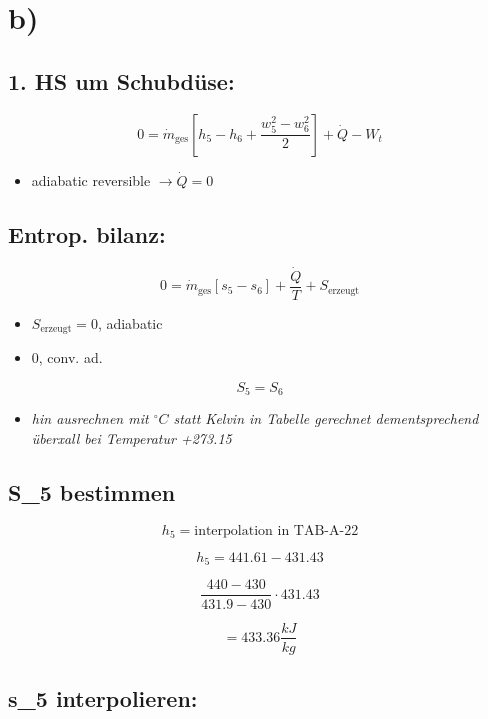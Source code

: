 

\section*{b)}

\subsection*{1. HS um Schubdüse:}

\[
0 = \dot{m}_{\text{ges}} \left[ h_5 - h_6 + \frac{w_5^2 - w_6^2}{2} \right] + \dot{Q} - W_t
\]

\begin{itemize}
    \item adiabatic reversible $\rightarrow \dot{Q} = 0$
\end{itemize}

\subsection*{Entrop. bilanz:}

\[
0 = \dot{m}_{\text{ges}} \left[ s_5 - s_6 \right] + \frac{\dot{Q}}{T} + S_{\text{erzeugt}}
\]

\begin{itemize}
    \item $S_{\text{erzeugt}} = 0$, adiabatic
    \item $0$, conv. ad.
\end{itemize}

\[
S_5 = S_6
\]

\begin{itemize}
    \item \textit{hin ausrechnen mit $^\circ C$ statt Kelvin in Tabelle gerechnet dementsprechend überxall bei Temperatur +273.15}
\end{itemize}

\subsection*{S_5 bestimmen}

\[
h_5 = \text{interpolation in TAB-A-22}
\]

\[
h_5 = 441.61 - 431.43
\]

\[
\frac{440 - 430}{431.9 - 430} \cdot 431.43
\]

\[
= 433.36 \frac{kJ}{kg}
\]

\subsection*{s_5 interpolieren:}

